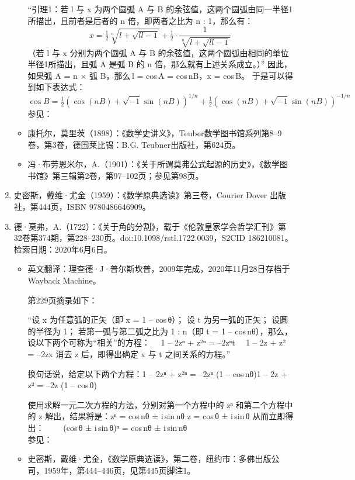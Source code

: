 \begin{enumerate}
\begin{itemize}
“引理1：若 l 与 x 为两个圆弧 A 与 B 的余弦值，这两个圆弧由同一半径1所描出，且前者是后者的 n 倍，即两者之比为 n : 1，那么有：
$$
x = \tfrac{1}{2} \sqrt[n]{l + \sqrt{ll - 1}} + \tfrac{1}{2} \cdot \frac{1}{\sqrt[n]{l + \sqrt{ll - 1}}}~
$$
（若 l 与 x 分别为两个圆弧 A 与 B 的余弦值，这两个圆弧由相同的单位半径1所描出，且弧 A 是弧 B 的 n 倍，那么就有上述关系成立。）”
因此，如果弧 A = n × 弧 B，那么 l = cos A = cos nB，x = cos B。
于是可以得到如下表达式：
$$
\cos B = \tfrac{1}{2} \left( \cos(nB) + \sqrt{-1} \sin(nB) \right)^{1/n} + \tfrac{1}{2} \left( \cos(nB) + \sqrt{-1} \sin(nB) \right)^{-1/n}~
$$
参见：
\item 康托尔，莫里茨（1898）：《数学史讲义》，Teuber数学图书馆系列第8–9卷，第3卷，德国莱比锡：B.G. Teubner出版社，第624页。
\item 冯·布劳恩米尔，A.（1901）：《关于所谓莫弗公式起源的历史》，《数学图书馆》第三辑第2卷，第97–102页；参见第98页。
\end{itemize}
\item 史密斯，戴维·尤金（1959）：《数学原典选读》第三卷，Courier Dover 出版社，第444页，ISBN 9780486646909。
\item 德·莫弗，A.（1722）：《关于角的分割》，载于《伦敦皇家学会哲学汇刊》第32卷第374期，第228–230页。doi:10.1098/rstl.1722.0039，S2CID 186210081。检索日期：2020年6月6日。
\begin{itemize}
\item 英文翻译：理查德·J·普尔斯坎普，2009年完成，2020年11月28日存档于 Wayback Machine。

第229页摘录如下：

“设 x 为任意弧的正矢（即 x = 1 – cos θ）；
设 t 为另一弧的正矢；
设圆的半径为 1；
若第一弧与第二弧之比为 1 : n（即 t = 1 – cos nθ），那么，设以下两个可称为“相关”的方程：
 1 – 2zⁿ + z²ⁿ = –2zⁿt
 1 – 2z + z² = –2zx
消去 z 后，即得出确定 x 与 t 之间关系的方程。”

换句话说，给定以下两个方程：1 – 2zⁿ + z²ⁿ = –2zⁿ (1 – cos nθ)1 – 2z + z² = –2z (1 – cos θ)

使用求解一元二次方程的方法，分别对第一个方程中的 zⁿ 和第二个方程中的 z 解出，结果将是：zⁿ = cos nθ ± i sin nθ z = cos θ ± i sin θ
从而立即得出：
  (cos θ ± i sin θ)ⁿ = cos nθ ± i sin nθ\\

参见：
\item 史密斯，戴维·尤金，《数学原典选读》，第二卷，纽约市：多佛出版公司，1959年，第444–446页，见第445页脚注1。
\end{itemize}

\end{enumerate}
